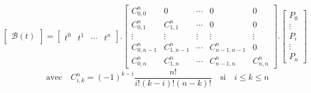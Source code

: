 \documentclass{amsart}
\begin{document}
  \pagestyle{empty}

  \begin{equation*}
    \begin{bmatrix}
      \mathscr{B}{\left(t\right)}
    \end{bmatrix}
    =
    \begin{bmatrix}
      {t}^{0} & {t}^{1} & \cdots & {t}^{n}
    \end{bmatrix}
    .
    \begin{bmatrix}
      {C}_{0,0}^{n}   &             0   & \cdots & 0                 &             0 \\
      {C}_{0,1}^{n}   & {C}_{1,1}^{n}   & \cdots & 0                 &             0 \\
      \vdots          & \vdots          & \vdots & \vdots            &        \vdots \\
      {C}_{0,n-1}^{n} & {C}_{1,n-1}^{n} & \cdots & {C}_{n-1,n-1}^{n} &             0 \\
      {C}_{0,n}^{n}   & {C}_{1,n}^{n}   & \cdots & {C}_{n-1,n}^{n}   & {C}_{n,n}^{n}
    \end{bmatrix}
    .
    \begin{bmatrix}
      {P}_{0} \\
      \vdots \\
      {P}_{i} \\
      \vdots \\
      {P}_{n}
    \end{bmatrix}
  \end{equation*}
  \begin{equation*}
    \quad \text{avec} \quad C_{i, k}^{n} = {\left(-1\right)}^{k-i} {\frac{n!}{i!\left({k-i}\right)!\left({n-k}\right)!}} \quad \text{si} \quad i \leq k \leq n
  \end{equation*}
\end{document}
